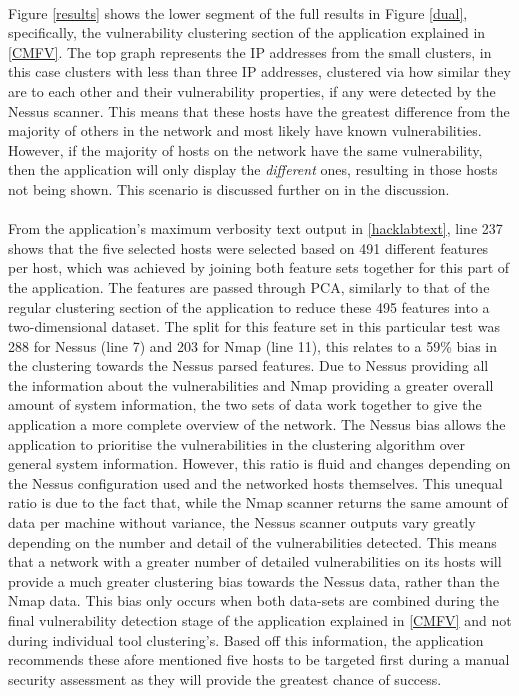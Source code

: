\paragraph{}Figure \ref{results} shows the lower segment of the full results in Figure \ref{dual}, specifically, the vulnerability clustering section of the application explained in \ref{CMFV}. The top graph represents the IP addresses from the small clusters, in this case clusters with less than three IP addresses, clustered via how similar they are to each other and their vulnerability properties, if any were detected by the Nessus scanner. This means that these hosts have the greatest difference from the majority of others in the network and most likely have known vulnerabilities. However, if the majority of hosts on the network have the same vulnerability, then the application will only display the \textit{different} ones, resulting in those hosts not being shown. This scenario is discussed further on in the discussion. 

\paragraph{}From the application’s maximum verbosity text output in \ref{hacklabtext}, line 237 shows that the five selected hosts were selected based on 491 different features per host, which was achieved by joining both feature sets together for this part of the application. The features are passed through PCA, similarly to that of the regular clustering section of the application to reduce these 495 features into a two-dimensional dataset. The split for this feature set in this particular test was 288 for Nessus (line 7) and 203 for Nmap (line 11), this relates to a 59\% bias in the clustering towards the Nessus parsed features. Due to Nessus providing all the information about the vulnerabilities and Nmap providing a greater overall amount of system information, the two sets of data work together to give the application a more complete overview of the network. The Nessus bias allows the application to prioritise the vulnerabilities in the clustering algorithm over general system information. However, this ratio is fluid and changes depending on the Nessus configuration used and the networked hosts themselves. This unequal ratio is due to the fact that, while the Nmap scanner returns the same amount of data per machine without variance, the Nessus scanner outputs vary greatly depending on the number and detail of the vulnerabilities detected. This means that a network with a greater number of detailed vulnerabilities on its hosts will provide a much greater clustering bias towards the Nessus data, rather than the Nmap data. This bias only occurs when both data-sets are combined during the final vulnerability detection stage of the application explained in \ref{CMFV} and not during individual tool clustering’s. Based off this information, the application recommends these afore mentioned five hosts to be targeted first during a manual security assessment as they will provide the greatest chance of success.

